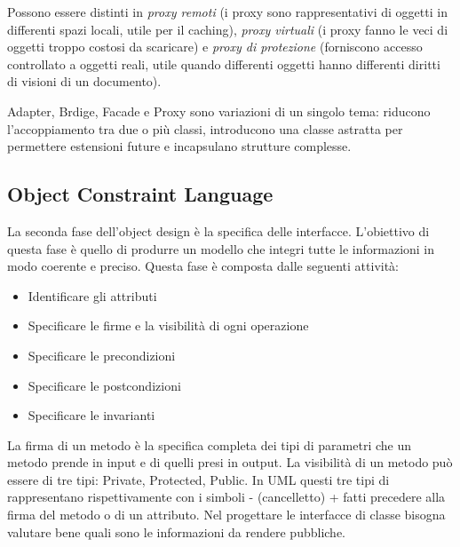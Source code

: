 \documentclass{article}
\begin{document}
            \vspace{3mm}
            
            Possono essere distinti in \textit{proxy remoti} (i proxy sono rappresentativi di oggetti in differenti spazi locali, utile per il caching), \textit{proxy virtuali} (i proxy fanno le veci di oggetti troppo costosi da scaricare) e\textit{ proxy di protezione} (forniscono accesso controllato a oggetti reali, utile quando differenti oggetti hanno differenti diritti di visioni di un documento).
                
            \vspace{3mm}
                
            Adapter, Brdige, Facade e Proxy sono variazioni di un singolo tema: riducono l'accoppiamento tra due o più classi, introducono una classe astratta per permettere estensioni future e incapsulano strutture complesse.
        
    \subsection{Object Constraint Language}
        La seconda fase dell’object design è la specifica delle interfacce. L’obiettivo di questa fase è quello di produrre un modello che integri tutte le informazioni in modo coerente e preciso. Questa fase è composta dalle seguenti attività:
    
        \begin{itemize}
            \item Identificare gli attributi
            
            \item Specificare le firme e la visibilità di ogni operazione
            
            \item Specificare le precondizioni
            
            \item Specificare le postcondizioni
            
            \item Specificare le invarianti 
        \end{itemize}
    
        La firma di un metodo è la specifica completa dei tipi di parametri che un metodo prende in input e di quelli presi in output. La visibilità di un metodo può essere di tre tipi: Private, Protected, Public. In UML questi tre tipi di rappresentano rispettivamente con i simboli - (cancelletto) + fatti precedere alla firma del metodo o di un attributo. Nel progettare le interfacce di classe bisogna valutare bene quali sono le informazioni da rendere pubbliche. 
        
\end{document}
